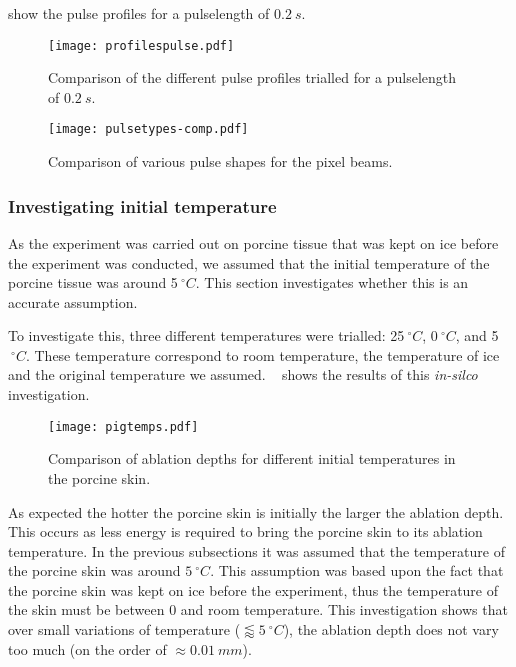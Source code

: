  show the pulse profiles for a pulselength of $0.2~s$.

\begin{figure}[!ht]
	\centering
	\texttt{[image: profilespulse.pdf]}
	\caption{Comparison of the different pulse profiles trialled for a pulselength of $0.2~s$.}
	\label{fig:pulseprofiles}
\end{figure}

\begin{figure}[!ht]
	\centering
	\texttt{[image: pulsetypes-comp.pdf]}
	\caption{Comparison of various pulse shapes for the pixel beams.}
	\label{fig:comparepulsetypes}
\end{figure}


\subsubsection{Investigating initial temperature}

As the experiment was carried out on porcine tissue that was kept on ice before the experiment was conducted, we assumed that the initial temperature of the porcine tissue was around 5$~^{\circ}C$.
This section investigates whether this is an accurate assumption.

To investigate this, three different temperatures were trialled: 25$~^{\circ}C$, 0$~^{\circ}C$, and 5$~^{\circ}C$.
These temperature correspond to room temperature, the temperature of ice and the original temperature we assumed.
~ shows the results of this \textit{in-silco} investigation.


\begin{figure}[!ht]
	\centering
	\texttt{[image: pigtemps.pdf]}
	\caption{Comparison of ablation depths for different initial temperatures in the porcine skin.}
	\label{fig:pigtempcomp}
\end{figure}

As expected the hotter the porcine skin is initially the larger the ablation depth.
This occurs as less energy is required to bring the porcine skin to its ablation temperature.
In the previous subsections it was assumed that the temperature of the porcine skin was around $5~^{\circ}C$.
This assumption was based upon the fact that the porcine skin was kept on ice before the experiment, thus the temperature of the skin must be between 0 and room temperature.
This investigation shows that over small variations of temperature ($\lessapprox 5~^{\circ}C$), the ablation depth does not vary too much (on the order of $\approx 0.01~mm$).

